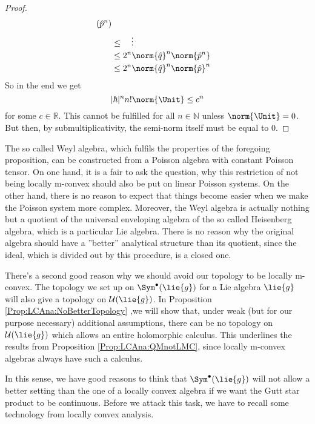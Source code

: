 \begin{proof}
\begin{align*}
{			(\hat{p}^n)
		}
		\\
		& \leq
		\quad \vdots
		\\
		& \leq
		2^n \norm{\hat{q}}^n
		\norm{ \hat{p}^n }
		\\
		& \leq
		2^n 
		\norm{\hat{q}}^n
		\norm{\hat{p}}^n
	\end{align*}
	So in the end we get
	\begin{equation*}
		|\hbar|^n n! \norm{ \Unit }
		\leq
		c^n
	\end{equation*}
	for some $c \in \mathbb{R}$. This cannot be fulfilled for all 
	$n \in \mathbb{N}$ unless $\norm{ \Unit } = 0$. But then, by
	submultiplicativity, the semi-norm itself must be equal to $0$.
\end{proof}
\begin{remark}
	The so called Weyl algebra, which fulfils the properties of the 
	foregoing proposition, can be constructed from a Poisson algebra with 
	constant Poisson tensor. On one hand, it is a fair to ask the question, 
	why this restriction of not being locally m-convex should also be put on 
	linear Poisson systems. On the other hand, there is no reason to 
	expect that things become easier when we make the Poisson system more 
	complex. Moreover, the Weyl algebra is actually nothing but a 
	quotient of the universal enveloping algebra of the so called 
	Heisenberg algebra, which is a particular Lie algebra. There is 
	no reason why the original algebra should have a ''better'' analytical 
	structure than its quotient, since the ideal, which is divided out by 
	this procedure, is a closed one.
\end{remark}
There's a second good reason why we should avoid our topology to be locally 
m-convex. The topology we set up on $\Sym^{\bullet}(\lie{g})$ for a Lie 
algebra $\lie{g}$ will also give a topology on $\mathcal{U}(\lie{g})$.
In Proposition \ref{Prop:LCAna:NoBetterTopology} ,we will show that, under 
weak (but for our purpose necessary) additional assumptions, there can be no 
topology on $\mathcal{U}(\lie{g})$ which allows an entire holomorphic 
calculus. This underlines the results from Proposition 
\ref{Prop:LCAna:QMnotLMC}, since locally m-convex algebras always have such a 
calculus.


In this sense, we have good reasons to think that 
$\Sym^{\bullet}(\lie{g})$ will not allow a better setting than the
one of a locally convex algebra if we want the Gutt star product to 
be continuous. Before we attack this task, we have to recall some
technology from locally convex analysis.



